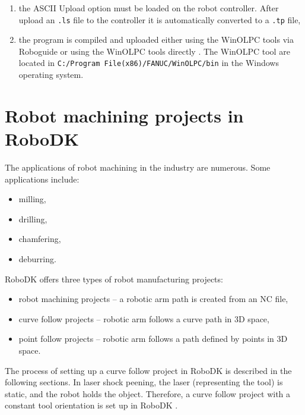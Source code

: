 \begin{enumerate}
\item the ASCII Upload option must be loaded on the robot controller. After upload an \texttt{.ls} file to the controller it is automatically converted to a \texttt{.tp} file,
\item the program is compiled and uploaded either using the WinOLPC  tools via Roboguide or using the WinOLPC tools directly \cite{fanuchandling}. The WinOLPC tool are located in \texttt{C:/Program File(x86)/FANUC/WinOLPC/bin} in the Windows operating system.

\end{enumerate}

\section{Robot machining projects in RoboDK}

The applications of robot machining in the industry are numerous. Some applications include:

\begin{itemize}

    \item milling,
    \item drilling,
    \item chamfering,
    \item deburring.

\end{itemize}

RoboDK offers three types of robot manufacturing projects:

\begin{itemize}

    \item robot machining projects -- a robotic arm path is created from an NC file,
    \item curve follow projects -- robotic arm follows a curve path in 3D space, 
    \item point follow projects -- robotic arm follows a path defined by points in 3D space.

\end{itemize}

The process of setting up a curve follow project in RoboDK is described in the following sections. In laser shock peening, the laser (representing the tool) is static, and the robot holds the object. Therefore, a curve follow project with a constant tool orientation is set up in RoboDK \cite{machiningproject}.


